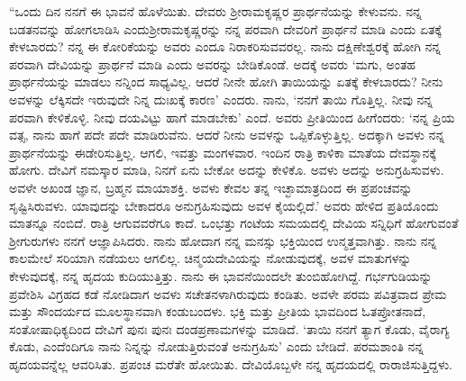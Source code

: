 “ಒಂದು ದಿನ ನನಗೆ ಈ ಭಾವನೆ ಹೊಳೆಯಿತು. ದೇವರು ಶ‍್ರೀರಾಮಕೃಷ್ಣರ ಪ್ರಾರ್ಥನೆಯನ್ನು ಕೇಳುವನು. ನನ್ನ ಬಡತನವನ್ನು ಹೋಗಲಾಡಿಸಿ ಎಂದು\break ಶ‍್ರೀರಾಮಕೃಷ್ಣರನ್ನು ನನ್ನ ಪರವಾಗಿ ದೇವರಿಗೆ ಪ್ರಾರ್ಥನೆ ಮಾಡಿ ಎಂದು ಏತಕ್ಕೆ ಕೇಳಬಾರದು? ನನ್ನ ಈ ಕೋರಿಕೆಯನ್ನು ಅವರು ಎಂದೂ ನಿರಾಕರಿಸುವವರಲ್ಲ. ನಾನು ದಕ್ಷಿಣೇಶ್ವರಕ್ಕೆ ಹೋಗಿ ನನ್ನ ಪರವಾಗಿ ದೇವಿಯನ್ನು ಪ್ರಾರ್ಥನೆ ಮಾಡಿ ಎಂದು ಅವರನ್ನು ಬೇಡಿಕೊಂಡೆ. ಅದಕ್ಕೆ ಅವರು ‘ಮಗು, ಅಂತಹ ಪ್ರಾರ್ಥನೆಯನ್ನು ಮಾಡಲು ನನ್ನಿಂದ ಸಾಧ್ಯವಿಲ್ಲ. ಆದರೆ ನೀನೇ ಹೋಗಿ ತಾಯಿಯನ್ನು ಏತಕ್ಕೆ ಕೇಳಬಾರದು? ನೀನು ಅವಳನ್ನು ಲೆಕ್ಕಿಸದೇ ಇರುವುದೇ ನಿನ್ನ ದುಃಖಕ್ಕೆ ಕಾರಣ’ ಎಂದರು. ನಾನು, ‘ನನಗೆ ತಾಯಿ ಗೊತ್ತಿಲ್ಲ. ನೀವು ನನ್ನ ಪರವಾಗಿ ಕೇಳಿಕೊಳ್ಳಿ. ನೀವು ದಯವಿಟ್ಟು ಹಾಗೆ ಮಾಡಬೇಕು’ ಎಂದೆ. ಅವರು ಪ್ರೀತಿಯಿಂದ ಹೀಗೆಂದರು: ‘ನನ್ನ ಪ್ರಿಯ ವತ್ಸ, ನಾನು ಹಾಗೆ ಪದೇ ಪದೇ ಮಾಡಿರುವೆನು. ಆದರೆ ನೀನು ಅವಳನ್ನು ಒಪ್ಪಿಕೊಳ್ಳುತ್ತಿಲ್ಲ. ಅದಕ್ಕಾಗಿ ಅವಳು ನನ್ನ ಪ್ರಾರ್ಥನೆಯನ್ನು ಈಡೇರಿಸುತ್ತಿಲ್ಲ. ಆಗಲಿ, ಇವತ್ತು ಮಂಗಳವಾರ. ಇಂದಿನ ರಾತ್ರಿ ಕಾಳಿಕಾ ಮಾತೆಯ ದೇವಸ್ಥಾನಕ್ಕೆ ಹೋಗು. ದೇವಿಗೆ ನಮಸ್ಕಾರ ಮಾಡಿ, ನಿನಗೆ ಏನು ಬೇಕೋ ಅದನ್ನು ಕೇಳಿಕೊ. ಅವಳು ಅದನ್ನು ಅನುಗ್ರಹಿಸುವಳು. ಅವಳೇ ಅಖಂಡ ಜ್ಞಾನ, ಬ್ರಹ್ಮನ ಮಾಯಾಶಕ್ತಿ. ಅವಳು ಕೇವಲ ತನ್ನ ಇಚ್ಛಾಮಾತ್ರದಿಂದ ಈ ಪ್ರಪಂಚವನ್ನು ಸೃಷ್ಟಿಸಿರುವಳು. ಯಾವುದನ್ನು ಬೇಕಾದರೂ ಅನುಗ್ರಹಿಸುವುದು ಅವಳ ಕೈಯಲ್ಲಿದೆ.’ ಅವರು ಹೇಳಿದ ಪ್ರತಿಯೊಂದು ಮಾತನ್ನೂ ನಂಬಿದೆ. ರಾತ್ರಿ ಆಗುವವರೆಗೂ ಕಾದೆ. ಒಂಭತ್ತು ಗಂಟೆಯ ಸಮಯದಲ್ಲಿ ದೇವಿಯ ಸನ್ನಿಧಿಗೆ ಹೋಗುವಂತೆ ಶ‍್ರೀಗುರುಗಳು ನನಗೆ ಆಜ್ಞಾಪಿಸಿದರು. ನಾನು ಹೋದಾಗ ನನ್ನ ಮನಸ್ಸು ಭಕ್ತಿಯಿಂದ ಉನ್ಮತ್ತವಾಗಿತ್ತು. ನಾನು ನನ್ನ ಕಾಲಮೇಲೆ ಸರಿಯಾಗಿ ನಡೆಯಲು ಆಗಲಿಲ್ಲ. ಚಿನ್ಮಯದೇವಿಯನ್ನು ನೋಡುವುದಕ್ಕೆ, ಅವಳ ಮಾತುಗಳನ್ನು ಕೇಳುವುದಕ್ಕೆ, ನನ್ನ ಹೃದಯ ಕುದಿಯುತ್ತಿತ್ತು. ನಾನು ಈ ಭಾವನೆಯಿಂದಲೇ ತುಂಬಿಹೋಗಿದ್ದೆ. ಗರ್ಭಗುಡಿಯನ್ನು ಪ್ರವೇಶಿಸಿ ವಿಗ್ರಹದ ಕಡೆ ನೋಡಿದಾಗ ಅವಳು ಸಚೇತನಳಾಗಿರುವುದು ಕಂಡಿತು. ಅವಳೇ ಪರಮ ಪವಿತ್ರವಾದ ಪ್ರೇಮ ಮತ್ತು ಸೌಂದರ್ಯದ ಮೂಲಸ್ಥಾನವಾಗಿ ಕಂಡುಬಂದಳು. ಭಕ್ತಿ ಮತ್ತು ಪ್ರೀತಿಯ ಭಾವದಿಂದ ಓತಪ್ರೋತನಾದೆ, ಸಂತೋಷಾಧಿಕ್ಯದಿಂದ ದೇವಿಗೆ ಪುನಃ ಪುನಃ ದಂಡಪ್ರಣಾಮಗಳನ್ನು ಮಾಡಿದೆ. ‘ತಾಯಿ ನನಗೆ ತ್ಯಾಗ ಕೊಡು, ವೈರಾಗ್ಯ ಕೊಡು, ಎಂದೆಂದಿಗೂ ನಾನು ನಿನ್ನನ್ನು ನೋಡುತ್ತಿರುವಂತೆ ಅನುಗ್ರಹಿಸು’ ಎಂದು ಬೇಡಿದೆ. ಪರಮಶಾಂತಿ ನನ್ನ ಹೃದಯವನ್ನೆಲ್ಲ ಆವರಿಸಿತು. ಪ್ರಪಂಚ ಮರೆತೇ ಹೋಯಿತು. ದೇವಿಯೊಬ್ಬಳೇ ನನ್ನ ಹೃದಯದಲ್ಲಿ ರಾರಾಜಿಸುತ್ತಿದ್ದಳು.


